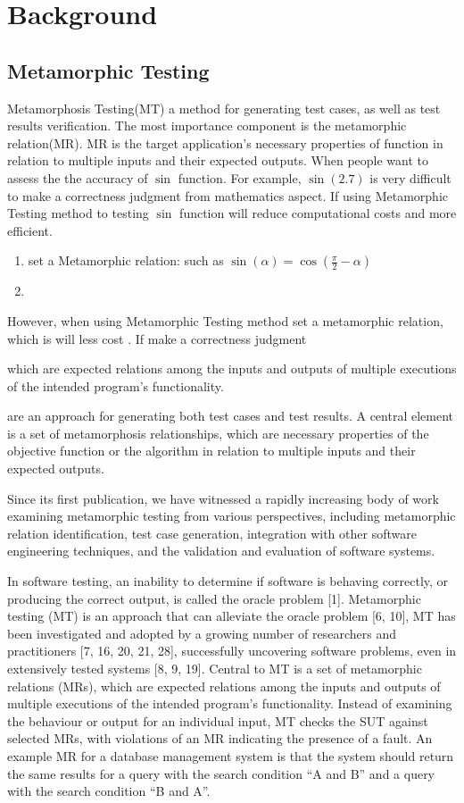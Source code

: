 \documentclass[conference]{IEEEtran}
\begin{document}
\section{Background}
\subsection{Metamorphic Testing}
Metamorphosis Testing(MT) a method for generating test cases, as well as test
results verification. The most importance component is the metamorphic
relation(MR). MR is the target application's necessary properties of function in relation to multiple
inputs and their expected outputs. When people want to assess the
the accuracy of $\sin$ function. For example, $\sin(2.7)$ is very difficult to
make a correctness judgment from mathematics aspect. If using Metamorphic
Testing method to testing $\sin$ function will reduce computational costs and
more efficient.
\begin{enumerate}
\item set a Metamorphic relation: such as $\sin(\alpha) = \cos(\frac{\pi}{2} - \alpha)$
\item

\end{enumerate}
However, when using
Metamorphic Testing method set a metamorphic relation, which is  will less cost . If  make a correctness judgment

which are expected relations among the inputs and
outputs of multiple executions of the intended program’s functionality.

are an approach for generating both test cases and test results. A central element is a set of metamorphosis
relationships, which are necessary properties of the objective function or the algorithm in relation to multiple inputs and their expected
outputs.


Since its first publication, we have witnessed a rapidly increasing body of work examining metamorphic testing from
various perspectives, including metamorphic relation identification, test case generation, integration with other software engineering
techniques, and the validation and evaluation of software systems.


In software testing, an inability to determine if software is behaving
correctly, or producing the correct output, is called the oracle problem [1]. Metamorphic testing (MT) is an approach that can alleviate
the oracle problem [6, 10], MT has been investigated and adopted by
a growing number of researchers and practitioners [7, 16, 20, 21, 28],
successfully uncovering software problems, even in extensively
tested systems [8, 9, 19]. Central to MT is a set of metamorphic
relations (MRs), which are expected relations among the inputs and
outputs of multiple executions of the intended program’s functionality. Instead of examining the behaviour or output for an individual
input, MT checks the SUT against selected MRs, with violations of
an MR indicating the presence of a fault.
An example MR for a database management system is that the
system should return the same results for a query with the search
condition “A and B” and a query with the search condition “B and
A”.
\end{document}
